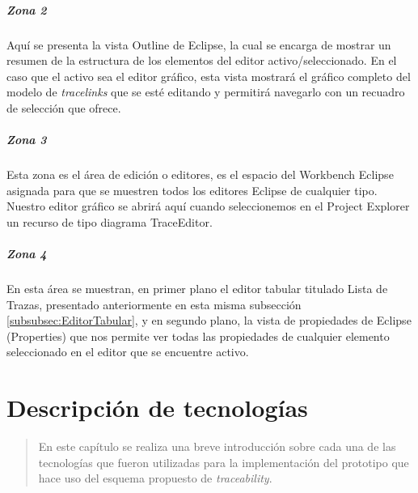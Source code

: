\documentclass[a4paper,12pt,oneside,spanish]{book}
\begin{document}
\paragraph{Zona 2}
Aquí se presenta la vista \textsf{Outline} de \textsf{Eclipse}, la cual se encarga de mostrar un resumen de la estructura de los elementos del editor activo/seleccionado. En el caso que el activo sea el editor gráfico, esta vista mostrará el gráfico completo del modelo de \textit{tracelinks} que se esté editando y permitirá navegarlo con un recuadro de selección que ofrece.


\paragraph{Zona 3}
Esta zona es el área de edición o editores, es el espacio del Workbench \textsf{Eclipse} asignada para que se muestren todos los editores \textsf{Eclipse} de cualquier tipo. Nuestro editor gráfico se abrirá aquí cuando seleccionemos en el \textsf{Project Explorer} un recurso de tipo diagrama \textsf{TraceEditor}.


\paragraph{Zona 4}
En esta área se muestran, en primer plano el editor tabular titulado \textsf{Lista de Trazas}, presentado anteriormente en esta misma subsección \ref{subsubsec:EditorTabular}, y en segundo plano, la vista de propiedades de \textsf{Eclipse} (\textsf{Properties}) que nos permite ver todas las propiedades de cualquier elemento seleccionado en el editor que se encuentre activo.




\chapter{Descripción de tecnologías}

\begin{quotation}
En este capítulo se realiza una breve introducción sobre cada una de las tecnologías que fueron utilizadas para la implementación del prototipo que hace uso del esquema propuesto de \textit{traceability}.
\end{quotation}


\bigskip


\minitoc 


\pagebreak
\end{document}
